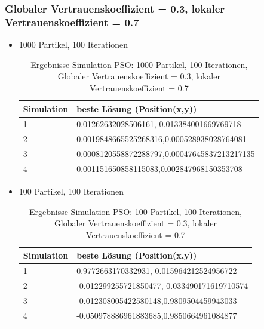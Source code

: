 \documentclass[a4paper, 11pt]{article}
\begin{document}
\subsubsection{Globaler Vertrauenskoeffizient = 0.3, lokaler Vertrauenskoeffizient = 0.7}
\begin{itemize}
	\item 1000 Partikel, 100 Iterationen
	\begin{table}[h]
		\begin{tabular}{p{2.5cm}|p{11cm}}
			Simulation & beste Lösung (Position(x,y))\\ \hline\hline
			1 & 0.01262632028506161,-0.013384001669769718\\ \hline
			2 & 0.0019848665525268316,0.000528938028764081\\ \hline
			3 & 0.0008120558872288797,0.00047645837213217135\\ \hline
			4 & 0.001151650858115083,0.002847968150353708\\ \hline
		\end{tabular}
		\caption{Ergebnisse Simulation \acs{PSO}: 1000 Partikel, 100 Iterationen, Globaler Vertrauenskoeffizient = 0.3, lokaler Vertrauenskoeffizient = 0.7}
		\label{tabframework}
	\end{table}
	\item 100 Partikel, 100 Iterationen
	\begin{table}[h]
		\begin{tabular}{p{2.5cm}|p{11cm}}
			Simulation & beste Lösung (Position(x,y))\\ \hline\hline
			1 & 0.9772663170332931,-0.015964212524956722\\ \hline
			2 & -0.012299255721850477,-0.033490171619710574\\ \hline
			3 & -0.012308005422580148,0.9809504459943033\\ \hline
			4 & -0.050978886961883685,0.9850664961084877\\ \hline
		\end{tabular}
		\caption{Ergebnisse Simulation \acs{PSO}: 100 Partikel, 100 Iterationen, Globaler Vertrauenskoeffizient = 0.3, lokaler Vertrauenskoeffizient = 0.7}
		\label{tabframework}
	\end{table}
\end{itemize}
\newpage
\end{document}
